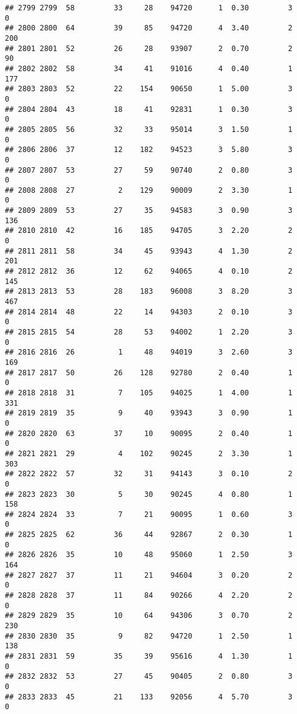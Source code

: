 \documentclass[
]{article}
\begin{document}
\begin{verbatim}
## 2799 2799  58         33     28    94720      1  0.30         3        0
## 2800 2800  64         39     85    94720      4  3.40         2      200
## 2801 2801  52         26     28    93907      2  0.70         2       90
## 2802 2802  58         34     41    91016      4  0.40         1      177
## 2803 2803  52         22    154    90650      1  5.00         3        0
## 2804 2804  43         18     41    92831      1  0.30         3        0
## 2805 2805  56         32     33    95014      3  1.50         1        0
## 2806 2806  37         12    182    94523      3  5.80         3        0
## 2807 2807  53         27     59    90740      2  0.80         3        0
## 2808 2808  27          2    129    90009      2  3.30         1        0
## 2809 2809  53         27     35    94583      3  0.90         3      136
## 2810 2810  42         16    185    94705      3  2.20         2        0
## 2811 2811  58         34     45    93943      4  1.30         2      201
## 2812 2812  36         12     62    94065      4  0.10         2      145
## 2813 2813  53         28    183    96008      3  8.20         3      467
## 2814 2814  48         22     14    94303      2  0.10         3        0
## 2815 2815  54         28     53    94002      1  2.20         3        0
## 2816 2816  26          1     48    94019      3  2.60         3      169
## 2817 2817  50         26    128    92780      2  0.40         1        0
## 2818 2818  31          7    105    94025      1  4.00         1      331
## 2819 2819  35          9     40    93943      3  0.90         1        0
## 2820 2820  63         37     10    90095      2  0.40         1        0
## 2821 2821  29          4    102    90245      2  3.30         1      303
## 2822 2822  57         32     31    94143      3  0.10         2        0
## 2823 2823  30          5     30    90245      4  0.80         1      158
## 2824 2824  33          7     21    90095      1  0.60         3        0
## 2825 2825  62         36     44    92867      2  0.30         1        0
## 2826 2826  35         10     48    95060      1  2.50         3      164
## 2827 2827  37         11     21    94604      3  0.20         2        0
## 2828 2828  37         11     84    90266      4  2.20         2        0
## 2829 2829  35         10     64    94306      3  0.70         2      230
## 2830 2830  35          9     82    94720      1  2.50         1      138
## 2831 2831  59         35     39    95616      4  1.30         1        0
## 2832 2832  53         27     45    90405      2  0.80         3        0
## 2833 2833  45         21    133    92056      4  5.70         3        0

\end{verbatim}
\end{document}
